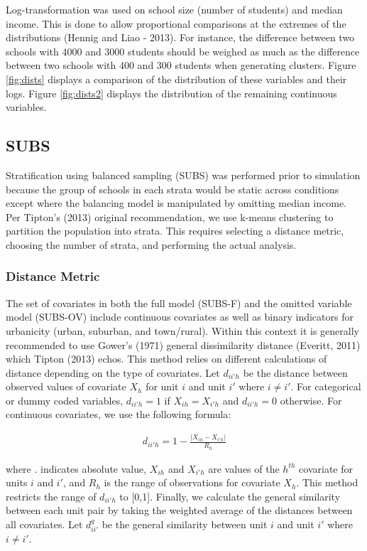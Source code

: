 \documentclass[floatsintext,man]{apa6}
\theoremstyle{definition}
\theoremstyle{definition}
\theoremstyle{definition}
\theoremstyle{remark}
\begin{document}
Log-transformation was used on school size (number of students) and
median income. This is done to allow proportional comparisons at the
extremes of the distributions (Hennig and Liao - 2013). For instance,
the difference between two schools with 4000 and 3000 students should be
weighed as much as the difference between two schools with 400 and 300
students when generating clusters. Figure \ref{fig:dists} displays a
comparison of the distribution of these variables and their logs. Figure
\ref{fig:dists2} displays the distribution of the remaining continuous
variables.

\subsection{SUBS}\label{subs}

Stratification using balanced sampling (SUBS) was performed prior to
simulation because the group of schools in each strata would be static
across conditions except where the balancing model is manipulated by
omitting median income. Per Tipton's (2013) original recommendation, we
use k-means clustering to partition the population into strata. This
requires selecting a distance metric, choosing the number of strata, and
performing the actual analysis.

\subsubsection{Distance Metric}\label{distance-metric}

The set of covariates in both the full model (SUBS-F) and the omitted
variable model (SUBS-OV) include continuous covariates as well as binary
indicators for urbanicity (urban, suburban, and town/rural). Within this
context it is generally recommended to use Gower's (1971) general
dissimilarity distance (Everitt, 2011) which Tipton (2013) echos. This
method relies on different calculations of distance depending on the
type of covariates. Let \(d_{ii'h}\) be the distance between observed
values of covariate \(X_{h}\) for unit \(i\) and unit \(i'\) where
\(i \ne i'\). For categorical or dummy coded variables, \(d_{ii'h} = 1\)
if \(X_{ih} = X_{i'h}\) and \(d_{ii'h} = 0\) otherwise. For continuous
covariates, we use the following formula:

\begin{align}
  d_{ii'h} = 1 - \frac{|X_{ih} - X_{i'h}|}{R_h}
\end{align}

where \textbar{}.\textbar{} indicates absolute value, \(X_{ih}\) and
\(X_{i'h}\) are values of the \(h^{th}\) covariate for units \(i\) and
\(i'\), and \(R_h\) is the range of observations for covariate \(X_h\).
This method restricts the range of \(d_{ii'h}\) to {[}0,1{]}. Finally,
we calculate the general similarity between each unit pair by taking the
weighted average of the distances between all covariates. Let
\(d^{g}_{ii'}\) be the general similarity between unit \(i\) and unit
\(i'\) where \(i \ne i'\).
\end{document}
